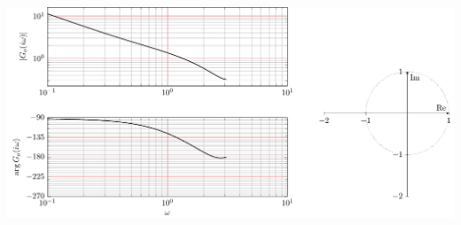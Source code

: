 \documentclass[letterpaper]{scrartcl}
\begin{document}
\begin{center}
\includegraphics[width=0.95\linewidth]{../../figures/bode-nyquist-exc-2}
\end{center}
\end{document}
